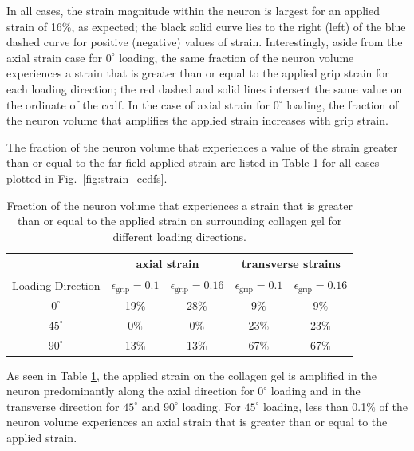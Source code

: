\documentclass[]{interact}
\begin{document}
In all cases, the strain magnitude within the neuron is largest for an applied strain of 16$\%$, as expected; the black solid curve lies to the right (left) of the blue dashed curve for positive (negative) values of strain. Interestingly, aside from the axial strain case for $0^{\circ}$ loading, the same fraction of the neuron volume experiences a strain that is greater than or equal to the applied grip strain for each loading direction; the red dashed and solid lines intersect the same value on the ordinate of the ccdf. In the case of axial strain for $0^{\circ}$ loading, the fraction of the neuron volume that amplifies the applied strain increases with grip strain. 

The fraction of the neuron volume that experiences a value of the strain greater than or equal to the far-field applied strain are listed in Table \ref{table:ccdf_volfrac_compare} for all cases plotted in Fig.\ \ref{fig:strain_ccdfs}.
%
\begin{table}[ht]
\begin{center}
\begin{tabular}{ c c c c c }
\hline\hline
& \multicolumn{2}{c}{axial strain} & \multicolumn{2}{c}{transverse strains} \\ \hline 
Loading Direction & $\epsilon_{\text{grip}}=0.1$ & $\epsilon_{\text{grip}}=0.16$ & $\epsilon_{\text{grip}}=0.1$ & $\epsilon_{\text{grip}}=0.16$ \\
\hline 
$0^{\circ}$ & 19$\%$ & 28$\%$ & 9$\%$ & 9$\%$\\ 
$45^{\circ}$ & 0$\%$ & 0$\%$ & 23$\%$ & 23$\%$\\
$90^{\circ}$ & 13$\%$ & 13$\%$ & 67$\%$ & 67$\%$\\ \hline \hline
\end{tabular}
\end{center}
\caption{Fraction of the neuron volume that experiences a strain that is greater than or equal to the applied strain on surrounding collagen gel for different loading directions.}
\label{table:ccdf_volfrac_compare}
\end{table}
%
As seen in Table \ref{table:ccdf_volfrac_compare}, the applied strain on the collagen gel is amplified in the neuron predominantly along the axial direction for $0^{\circ}$ loading and in the transverse direction for $45^{\circ}$ and $90^{\circ}$ loading. For $45^{\circ}$ loading, less than 0.1$\%$ of the neuron volume experiences an axial strain that is greater than or equal to the applied strain.
\end{document}
